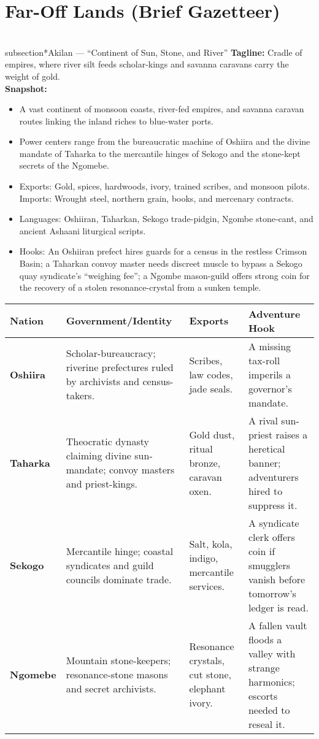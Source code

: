 \documentclass[11pt]{book}
\begin{document}
\section{Far-Off Lands (Brief Gazetteer)}

\\subsection*{Akilan — “Continent of Sun, Stone, and River”}
\textbf{Tagline:} Cradle of empires, where river silt feeds scholar-kings and savanna caravans carry the weight of gold.\\
\textbf{Snapshot:}
\begin{itemize}
  \item A vast continent of monsoon coasts, river-fed empires, and savanna caravan routes linking the inland riches to blue-water ports.
  \item Power centers range from the bureaucratic machine of Oshiira and the divine mandate of Taharka to the mercantile hinges of Sekogo and the stone-kept secrets of the Ngomebe.
  \item Exports: Gold, spices, hardwoods, ivory, trained scribes, and monsoon pilots. Imports: Wrought steel, northern grain, books, and mercenary contracts.
  \item Languages: Oshiiran, Taharkan, Sekogo trade-pidgin, Ngombe stone-cant, and ancient Ashaani liturgical scripts.
  \item Hooks: An Oshiiran prefect hires guards for a census in the restless Crimson Basin; a Taharkan convoy master needs discreet muscle to bypass a Sekogo quay syndicate's ``weighing fee''; a Ngombe mason-guild offers strong coin for the recovery of a stolen resonance-crystal from a sunken temple.
\end{itemize}

\begin{center}
\begin{tabular}{|p{3cm}|p{3.5cm}|p{3.5cm}|p{5.5cm}|}
\hline
\textbf{Nation} & \textbf{Government/Identity} & \textbf{Exports} & \textbf{Adventure Hook} \\
\hline
\textbf{Oshiira} & Scholar-bureaucracy; riverine prefectures ruled by archivists and census-takers. & Scribes, law codes, jade seals. & A missing tax-roll imperils a governor’s mandate. \\
\hline
\textbf{Taharka} & Theocratic dynasty claiming divine sun-mandate; convoy masters and priest-kings. & Gold dust, ritual bronze, caravan oxen. & A rival sun-priest raises a heretical banner; adventurers hired to suppress it. \\
\hline
\textbf{Sekogo} & Mercantile hinge; coastal syndicates and guild councils dominate trade. & Salt, kola, indigo, mercantile services. & A syndicate clerk offers coin if smugglers vanish before tomorrow’s ledger is read. \\
\hline
\textbf{Ngomebe} & Mountain stone-keepers; resonance-stone masons and secret archivists. & Resonance crystals, cut stone, elephant ivory. & A fallen vault floods a valley with strange harmonics; escorts needed to reseal it. \\
\hline
\end{tabular}
\end{center}
\end{document}
